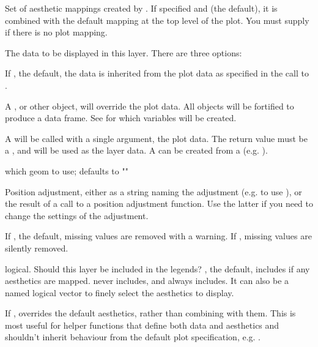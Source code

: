 \documentclass[a4paper]{book}
\begin{document}
\begin{Arguments}
\begin{ldescription}
\item[\code{mapping}] Set of aesthetic mappings created by . If specified and
 (the default), it is combined with the default mapping
at the top level of the plot. You must supply  if there is no plot
mapping.

\item[\code{data}] The data to be displayed in this layer. There are three
options:

If , the default, the data is inherited from the plot
data as specified in the call to .

A , or other object, will override the plot
data. All objects will be fortified to produce a data frame. See
 for which variables will be created.

A  will be called with a single argument,
the plot data. The return value must be a , and
will be used as the layer data. A  can be created
from a  (e.g. ).

\item[\code{geom}] which geom to use; defaults to ""

\item[\code{position}] Position adjustment, either as a string naming the adjustment
(e.g.  to use ), or the result of a call to a
position adjustment function. Use the latter if you need to change the
settings of the adjustment.

\item[\code{na.rm}] If , the default, missing values are removed with
a warning. If , missing values are silently removed.

\item[\code{show.legend}] logical. Should this layer be included in the legends?
, the default, includes if any aesthetics are mapped.
 never includes, and  always includes.
It can also be a named logical vector to finely select the aesthetics to
display.

\item[\code{inherit.aes}] If , overrides the default aesthetics,
rather than combining with them. This is most useful for helper functions
that define both data and aesthetics and shouldn't inherit behaviour from
the default plot specification, e.g. .


\end{ldescription}
\end{Arguments}
\end{document}
